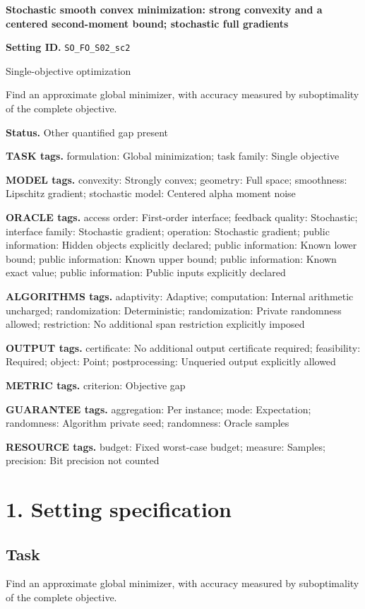 \documentclass[10pt,a4paper]{article}
\begin{document}
\raggedright

{\LARGE\bfseries\sffamily\color{AtlasNavy} Stochastic smooth convex minimization: strong convexity and a centered second-moment bound; stochastic full gradients\par}\vspace{5pt}
\textbf{Setting ID.} \texttt{SO\_\allowbreak{}FO\_\allowbreak{}S02\_\allowbreak{}sc2}

Single-objective optimization

Find an approximate global minimizer, with accuracy measured by suboptimality of the complete objective.

\textbf{Status.} Other quantified gap present

\textbf{TASK tags.} formulation: Global minimization; task family: Single objective

\textbf{MODEL tags.} convexity: Strongly convex; geometry: Full space; smoothness: Lipschitz gradient; stochastic model: Centered alpha moment noise

\textbf{ORACLE tags.} access order: First-order interface; feedback quality: Stochastic; interface family: Stochastic gradient; operation: Stochastic gradient; public information: Hidden objects explicitly declared; public information: Known lower bound; public information: Known upper bound; public information: Known exact value; public information: Public inputs explicitly declared

\textbf{ALGORITHMS tags.} adaptivity: Adaptive; computation: Internal arithmetic uncharged; randomization: Deterministic; randomization: Private randomness allowed; restriction: No additional span restriction explicitly imposed

\textbf{OUTPUT tags.} certificate: No additional output certificate required; feasibility: Required; object: Point; postprocessing: Unqueried output explicitly allowed

\textbf{METRIC tags.} criterion: Objective gap

\textbf{GUARANTEE tags.} aggregation: Per instance; mode: Expectation; randomness: Algorithm private seed; randomness: Oracle samples

\textbf{RESOURCE tags.} budget: Fixed worst-case budget; measure: Samples; precision: Bit precision not counted

\section{1. Setting specification}
\subsection{Task}
Find an approximate global minimizer, with accuracy measured by suboptimality of the complete objective.
\end{document}

